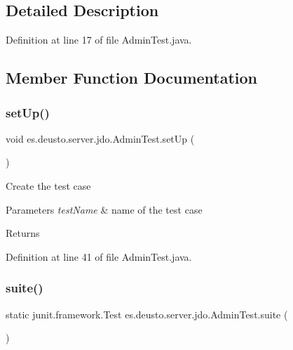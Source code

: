 \subsection{Detailed Description}


Definition at line 17 of file Admin\+Test.\+java.



\subsection{Member Function Documentation}
\mbox{\label{classes_1_1deusto_1_1server_1_1jdo_1_1_admin_test_acaa555000602cd83a7e73550a7f114b4}} 
\subsubsection{\texorpdfstring{set\+Up()}{setUp()}}
{\footnotesize\ttfamily void es.\+deusto.\+server.\+jdo.\+Admin\+Test.\+set\+Up (\begin{DoxyParamCaption}{ }\end{DoxyParamCaption})}

Create the test case


\begin{DoxyParams}{Parameters}
{\em test\+Name} & name of the test case \\
\hline
\end{DoxyParams}
\begin{DoxyReturn}{Returns}

\end{DoxyReturn}


Definition at line 41 of file Admin\+Test.\+java.

\mbox{\label{classes_1_1deusto_1_1server_1_1jdo_1_1_admin_test_aa2992f98029130ba303b2a7753d3c35d}} 
\subsubsection{\texorpdfstring{suite()}{suite()}}
{\footnotesize\ttfamily static junit.\+framework.\+Test es.\+deusto.\+server.\+jdo.\+Admin\+Test.\+suite (\begin{DoxyParamCaption}{ }\end{DoxyParamCaption})\hspace{0.3cm}{\ttfamily [static]}}

